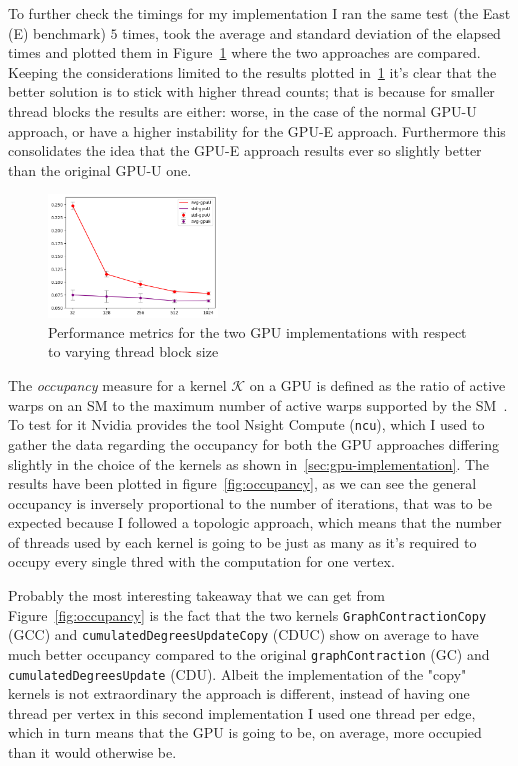 \documentclass[a4paper,10pt]{article}
\begin{document}
To further check the timings for my implementation I ran the same test (the East (E) benchmark) $5$ times, took the average and standard deviation of the elapsed times and plotted them in Figure~\ref{fig:avg-std-timings} where the two approaches are compared. Keeping the considerations limited to the results plotted in~\ref{fig:avg-std-timings} it's clear that the better solution is to stick with higher thread counts; that is because for smaller thread blocks the results are either: worse, in the case of the normal GPU-U approach, or have a higher instability for the GPU-E approach. Furthermore this consolidates the idea that the GPU-E approach results ever so slightly better than the original GPU-U one.

\begin{figure} %
	\centering
	\includegraphics[width=0.4\textwidth]{fig/timings.png} %
	\caption{Performance metrics for the two GPU implementations with respect to varying thread block size}
	\label{fig:avg-std-timings}
\end{figure}
\noindent The \emph{occupancy} measure for a kernel $\mathcal{K}$ on a GPU is defined as the ratio of active warps on an SM to the maximum number of active warps supported by the SM~\cite{def-occupancy}. To test for it Nvidia provides the tool Nsight Compute (\texttt{ncu}), which I used to gather the data regarding the occupancy for both the GPU approaches differing slightly in the choice of the kernels as shown in~\ref{sec:gpu-implementation}. The results have been plotted in figure~\ref{fig:occupancy}, as we can see the general occupancy is inversely proportional to the number of iterations, that was to be expected because I followed a topologic approach, which means that the number of threads used by each kernel is going to be just as many as it's required to occupy every single thred with the computation for one vertex.

\medskip
\noindent Probably the most interesting takeaway that we can get from Figure~\ref{fig:occupancy} is the fact that the two kernels \texttt{GraphContractionCopy} (GCC) and \texttt{cumulatedDegreesUpdateCopy} (CDUC) show on average to have much better occupancy compared to the original \texttt{graphContraction} (GC) and \texttt{cumulatedDegreesUpdate} (CDU). Albeit the implementation of the "copy" kernels is not extraordinary the approach is different, instead of having one thread per vertex in this second implementation I used one thread per edge, which in turn means that the GPU is going to be, on average, more occupied than it would otherwise be.
\end{document}
